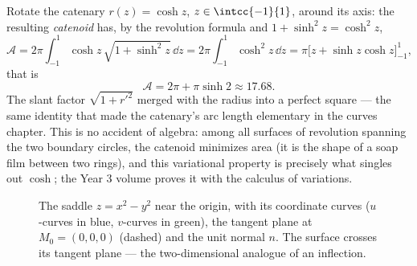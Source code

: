 \begin{example}\label{ex:b2:surfaces:catenoid}
Rotate the catenary $r(z) = \cosh z$, $z \in \intcc{-1}{1}$,
around its axis: the resulting \emph{catenoid} has, by the
revolution formula and $1 + \sinh^2 z = \cosh^2 z$,
\[
\mathcal A = 2\pi\int_{-1}^1\cosh z\,\sqrt{1 + \sinh^2z}\,
\dd z = 2\pi\int_{-1}^1\cosh^2z\,\dd z
= \pi\bigl[z + \sinh z\cosh z\bigr]_{-1}^{1},
\]
that is
\[
\mathcal A = 2\pi + \pi\sinh 2 \approx 17.68 .
\]
The slant factor $\sqrt{1 + r'^2}$ merged with the radius
into a perfect square --- the same identity that made the
catenary's arc length elementary in the curves chapter. This
is no accident of algebra: among all surfaces of revolution
spanning the two boundary circles, the catenoid minimizes
area (it is the shape of a soap film between two rings), and
this variational property is precisely what singles out
$\cosh$; the Year 3 volume proves it with the calculus of
variations.
\end{example}

\begin{figure}[ht]
\centering
{}
\caption{The saddle $z = x^2 - y^2$ near the origin, with its
coordinate curves ($u$-curves in blue, $v$-curves in green), the
tangent plane at $M_0 = (0,0,0)$ (dashed) and the unit normal $n$.
The surface crosses its tangent plane --- the two-dimensional
analogue of an inflection.}
\label{fig:b2:surfaces:saddle}
\end{figure}

